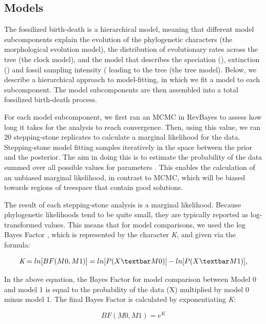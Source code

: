 \documentclass{article}
\begin{document}
\subsection{Models}
The fossilized birth-death is a hierarchical model, meaning that different model subcomponents explain the evolution of the phylogenetic characters (the morphological evolution model), the distribution of evolutionary rates across the tree (the clock model), and the model that describes the speciation (\textit{\textlambda}), extinction (\textit{\textmu}) and fossil sampling intensity (\textit{\textpsi} leading to the tree (the tree model). 
Below, we describe a hierarchical approach to model-fitting, in which we fit a model to each subcomponent.
The model subcomponents are then assembled into a total fossilized birth-death process.

For each model subcomponent, we first ran an MCMC in RevBayes to assess how long it takes for the analysis to reach convergence. 
Then, using this value, we ran 20 stepping-stone replicates to calculate a marginal likelihood for the data.
Stepping-stone model fitting samples iteratively in the space between the prior and the posterior.
The aim in doing this is to estimate the probability of the data summed over all possible values for parameters  \citep{Xie2011}. 
This enables the calculation of an unbiased marginal likelihood, in contrast to MCMC, which will be biased towards regions of treespace that contain good solutions. 

The result of each stepping-stone analysis is a marginal likelihood.
Because phylogenetic likelihoods tend to be quite small, they are typically reported as log-transformed values.
This means that for model comparisons, we used the log Bayes Factor \citep{Kass1995}, which is represented by the character \textit{K}, and given via the formula:

\begin{center}
  \[  \textit{K}=ln[BF(M0,M1)]=ln[P(X \textbar M0)] - ln[P(X \textbar M1)],  \]
\end{center}    
    
In the above equation, the Bayes Factor for model comparison between Model 0 and model 1 is equal to the probability of the data (X) multiplied by model 0 minus model 1. The final Bayes Factor is calculated by exponentiating \textit{K}:

\begin{center}
  \[  BF(M0,M1)=\textit{e}^\textit{K} \]
\end{center}
\end{document}
